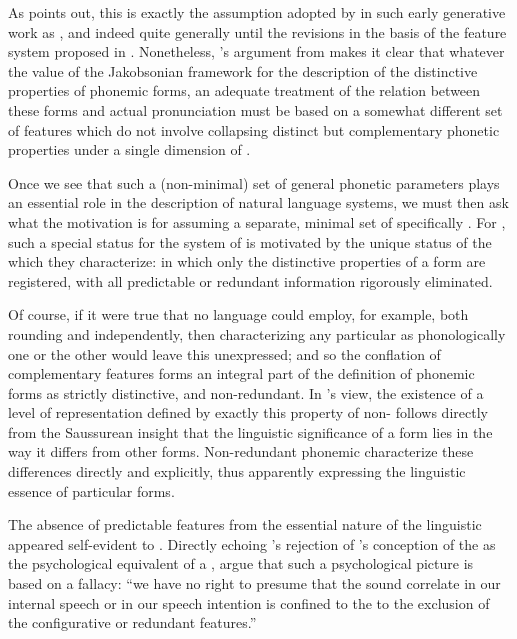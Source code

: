 As {\McCawley} points out, this is exactly the assumption adopted by
{\Halle} in such early generative work as \citet{halle:spr}, and indeed
quite generally until the revisions in the basis of the feature system
proposed in \citet{spe}. Nonetheless, {\McCawley}'s argument from 
makes it clear that whatever the value of the Jakobsonian framework
for the description of the distinctive properties of phonemic forms,
an adequate treatment of the relation between these forms and actual
pronunciation must be based on a somewhat different set of features
which do not involve collapsing distinct but complementary phonetic
properties under a single dimension of .

Once we see that such a (non-minimal) set of general phonetic
parameters plays an essential role in the description of natural
language systems, we must then ask what the motivation is for assuming
a separate, minimal set of specifically . For
{\Jakobson}, such a special status for the system of 
is motivated by the unique status of the  which they
characterize:  in which only the distinctive properties
of a form are registered, with all predictable or redundant
information rigorously eliminated.

Of course, if it were true that no language could employ, for example,
both rounding and  independently, then characterizing any
particular  as phonologically one or the other would leave
this  unexpressed; and so the conflation of
complementary features forms an integral part of the definition of
phonemic forms as strictly distinctive, and non-redundant. In
{\Jakobson}'s view, the existence of a level of representation defined by
exactly this property of non- follows directly from the
Saussurean insight that the linguistic significance of a form lies in
the way it differs from other forms. Non-redundant phonemic
 characterize these differences directly and
explicitly, thus apparently expressing the linguistic essence of
particular forms.

The absence of predictable features from the essential nature of the
linguistic  appeared self-evident to {\Jakobson}. Directly
echoing {\Trubetzkoy}'s rejection of {\Baudouin}'s conception of the 
as the psychological equivalent of a ,
\citet{jakobson.halle56:fundamentals} argue that such a psychological
picture is based on a fallacy: ``we have no right to presume that the
sound correlate in our internal speech or in our speech intention is
confined to the  to the exclusion of the
configurative or redundant features.''

